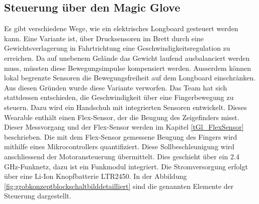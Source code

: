 \subsection*{Steuerung über den Magic Glove}
Es gibt verschiedene Wege, wie ein elektrisches Longboard gesteuert werden kann. Eine Variante ist, über Drucksensoren im Brett durch eine Gewichtsverlagerung in Fahrtrichtung eine Geschwindigkeitsregulation zu erreichen. Da auf unebenem Gelände das Gewicht laufend ausbalanciert werden muss, müssten diese Bewegungsimpulse kompensiert werden. Ausserdem können lokal begrenzte Sensoren die Bewegungsfreiheit auf dem Longboard einschränken.
Aus diesen Gründen wurde diese Variante verworfen. Das Team hat sich stattdessen entschieden, die Geschwindigkeit über eine Fingerbewegung zu steuern. Dazu wird ein Handschuh mit integrierten Sensoren entwickelt. Dieses Wearable enthält einen Flex-Sensor, der die Beugung des Zeigefinders misst. Dieser Messvorgang und der Flex-Sensor werden im Kapitel \ref{tGl_FlexSensor} beschrieben. Die mit dem Flex-Sensor gemessene Beugung des Fingers wird mithilfe eines Mikrocontrollers quantifiziert. Diese Sollbeschleunigung wird anschliessend der Motoransteuerung übermittelt. Dies geschieht über ein 2.4 GHz-Funknetz, dazu ist ein Funkmodul integriert. Die Stromversorgung erfolgt über eine Li-Ion Knopfbatterie LTR2450. In der Abbildung \ref{fig:grobkonzeptblockschaltbilddetailliert} sind die genannten Elemente der Steuerung dargestellt.

